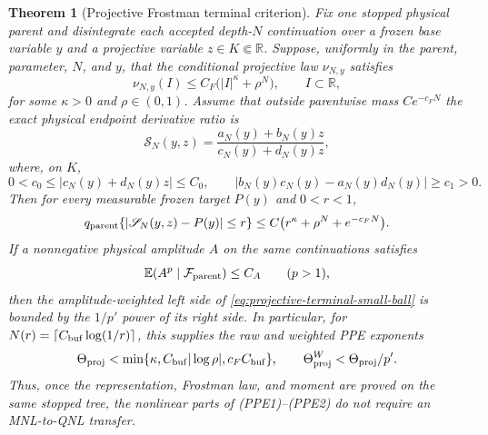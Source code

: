 \documentclass[11pt]{article}
\newtheorem{theorem}{Theorem}[section]
\begin{document}
\begin{theorem}[Projective Frostman terminal criterion]
\label{thm:projective-frostman-terminal-PPE}
Fix one stopped physical parent and disintegrate each accepted depth-$N$
continuation over a frozen base variable $y$ and a projective variable
$z\in K\Subset\mathbb R$.  Suppose, uniformly in the parent, parameter,
$N$, and $y$, that the conditional projective law $\nu_{N,y}$ satisfies
\begin{equation}
\label{eq:projective-terminal-frostman}
 \nu_{N,y}(I)
 \le C_F\bigl(|I|^\kappa+\rho^N\bigr),
 \qquad I\subset\mathbb R,
\end{equation}
for some $\kappa>0$ and $\rho\in(0,1)$.  Assume that outside parentwise
mass $Ce^{-c_FN}$ the exact physical endpoint derivative ratio is
\begin{equation}
\label{eq:projective-terminal-mobius}
 \mathscr S_N(y,z)
 =\frac{a_N(y)+b_N(y)z}{c_N(y)+d_N(y)z},
\end{equation}
where, on $K$,
\begin{equation}
\label{eq:projective-terminal-transversality}
 0<c_0\le |c_N(y)+d_N(y)z|\le C_0,
 \qquad
 |b_N(y)c_N(y)-a_N(y)d_N(y)|\ge c_1>0.
\end{equation}
Then for every measurable frozen target $P(y)$ and $0<r<1$,
\begin{equation}
\label{eq:projective-terminal-small-ball}
 q_{\rm parent}
 \{ |\mathscr S_N(y,z)-P(y)|\le r\}
 \le C\bigl(r^\kappa+\rho^N+e^{-c_FN}\bigr).
\end{equation}
If a nonnegative physical amplitude $A$ on the same continuations satisfies
\begin{equation}
\label{eq:projective-terminal-amplitude-moment}
 \mathbb E(A^p\mid\mathcal F_{\rm parent})\le C_A
 \qquad(p>1),
\end{equation}
then the amplitude-weighted left side of
\eqref{eq:projective-terminal-small-ball} is bounded by the
$1/p'$ power of its right side.  In particular, for
$N(r)=\lceil C_{\rm buf}\log(1/r)\rceil$, this supplies the raw and weighted
PPE exponents
\begin{equation}
\label{eq:projective-terminal-PPE-exponents}
 \Theta_{\rm proj}
 <\min\{\kappa,C_{\rm buf}|\log\rho|,c_FC_{\rm buf}\},
 \qquad
 \Theta_{\rm proj}^{W}<\Theta_{\rm proj}/p'.
\end{equation}
Thus, once the representation, Frostman law, and moment are proved on the
same stopped tree, the nonlinear parts of \textup{(PPE1)--(PPE2)} do not
require an MNL-to-QNL transfer.
\end{theorem}
\end{document}
